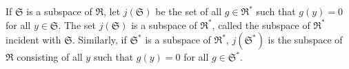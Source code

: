 If $\mathfrak{S}$ is a subspace of $\mathfrak{R}$, let $j(\mathfrak{S})$ be the set of all $g \in \mathfrak{R}^*$ such that $g(y) = 0$ for all $y \in \mathfrak{S}$. The set $j(\mathfrak{S})$ is a subspace of $\mathfrak{R}^*$, called the subspace of $\mathfrak{R}^*$ incident with $\mathfrak{S}$. Similarly, if $\mathfrak{S}^*$ is a subspace of $\mathfrak{R}^*$, $j(\mathfrak{S}^*)$ is the subspace of $\mathfrak{R}$ consisting of all $y$ such that $g(y) = 0$ for all $g \in \mathfrak{S}^*$.
